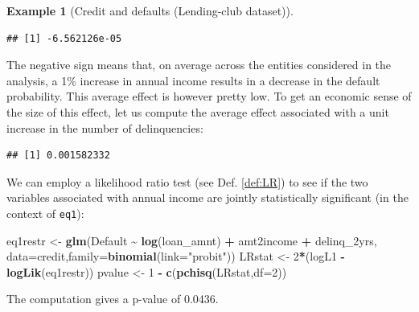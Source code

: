 \documentclass[
  12pt,
]{book}
\newenvironment{Shaded}{\begin{snugshade}}{\end{snugshade}}
\newcommand{\AttributeTok}[1]{\textcolor[rgb]{0.13,0.29,0.53}{#1}}
\newcommand{\DecValTok}[1]{\textcolor[rgb]{0.00,0.00,0.81}{#1}}
\newcommand{\FunctionTok}[1]{\textcolor[rgb]{0.13,0.29,0.53}{\textbf{#1}}}
\newcommand{\NormalTok}[1]{#1}
\newcommand{\OtherTok}[1]{\textcolor[rgb]{0.56,0.35,0.01}{#1}}
\newcommand{\SpecialCharTok}[1]{\textcolor[rgb]{0.81,0.36,0.00}{\textbf{#1}}}
\newcommand{\StringTok}[1]{\textcolor[rgb]{0.31,0.60,0.02}{#1}}
\theoremstyle{definition}
\theoremstyle{definition}
\newtheorem{example}{Example}[chapter]
\theoremstyle{definition}
\theoremstyle{definition}
\theoremstyle{remark}
\begin{document}
\begin{example}[Credit and defaults (Lending-club dataset)]
\begin{verbatim}
## [1] -6.562126e-05
\end{verbatim}

The negative sign means that, on average across the entities considered in the analysis, a 1\% increase in annual income results in a decrease in the default probability. This average effect is however pretty low. To get an economic sense of the size of this effect, let us compute the average effect associated with a unit increase in the number of delinquencies:

\begin{Shaded}
\end{Shaded}

\begin{verbatim}
## [1] 0.001582332
\end{verbatim}

We can employ a likelihood ratio test (see Def. \ref{def:LR}) to see if the two variables associated with annual income are jointly statistically significant (in the context of \texttt{eq1}):

\begin{Shaded}
\begin{Highlighting}[]
\NormalTok{eq1restr }\OtherTok{\textless{}{-}} \FunctionTok{glm}\NormalTok{(Default }\SpecialCharTok{\textasciitilde{}} \FunctionTok{log}\NormalTok{(loan\_amnt) }\SpecialCharTok{+}\NormalTok{ amt2income }\SpecialCharTok{+}\NormalTok{ delinq\_2yrs,}
                \AttributeTok{data=}\NormalTok{credit,}\AttributeTok{family=}\FunctionTok{binomial}\NormalTok{(}\AttributeTok{link=}\StringTok{"probit"}\NormalTok{))}
\NormalTok{LRstat }\OtherTok{\textless{}{-}} \DecValTok{2}\SpecialCharTok{*}\NormalTok{(logL1 }\SpecialCharTok{{-}} \FunctionTok{logLik}\NormalTok{(eq1restr))}
\NormalTok{pvalue }\OtherTok{\textless{}{-}} \DecValTok{1} \SpecialCharTok{{-}} \FunctionTok{c}\NormalTok{(}\FunctionTok{pchisq}\NormalTok{(LRstat,}\AttributeTok{df=}\DecValTok{2}\NormalTok{))}
\end{Highlighting}
\end{Shaded}

The computation gives a p-value of 0.0436.
\end{example}
\end{document}
